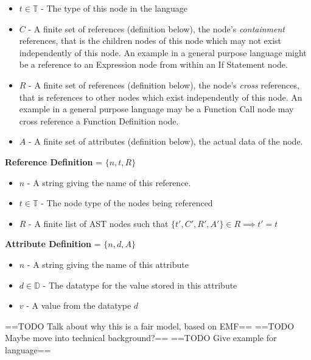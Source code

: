 \documentclass{article}
\begin{document}
\begin{itemize}
\item $t\in \mathbb{T}$ - The type of this node in the language
\item $C$ - A finite set of references (definition below), the node's \emph{containment} references, that is the children nodes of this node which may not exist independently of this node. An example in a general purpose language might be a reference to an Expression node from within an If Statement node.
\item $R$ - A finite set of references (definition below), the node's \emph{cross} references, that is references to other nodes which exist independently of this node. An example in a general purpose language may be a Function Call node may cross reference a Function Definition node.
\item $A$ - A finite set of attributes (definition below), the actual data of the node.
\end{itemize}
%
\textbf{Reference Definition} = $\{n,t,R\}$ 
\begin{itemize}
\item $n$ - A string giving the name of this reference.
\item $t\in \mathbb{T}$ - The node type of the nodes being referenced 
\item $R$ - A finite list of AST nodes such that $\{t',C',R',A'\} \in R \implies t'=t$
\end{itemize}
%
\textbf{Attribute Definition} = $\{n,d,A\}$ 
\begin{itemize}
\item $n$ - A string giving the name of this attribute
\item $d\in \mathbb{D}$ - The datatype for the value stored in this attribute
\item $v$ - A value from the datatype $d$
\end{itemize}


==TODO Talk about why this is a fair model, based on EMF== 
==TODO Maybe move into technical background?== 
==TODO Give example for language==
\end{document}
